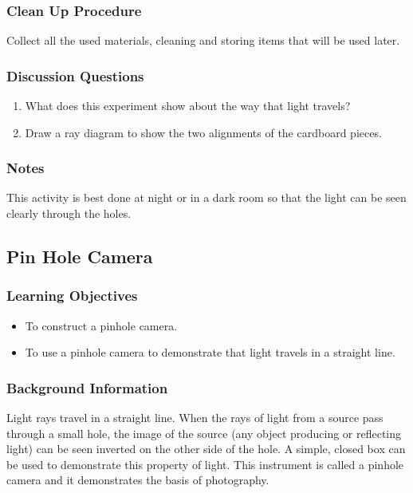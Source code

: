 \subsubsection*{Clean Up Procedure}
Collect all the used materials, cleaning and storing items that will be used later.

\subsubsection*{Discussion Questions}
\begin{enumerate}
\item{What does this experiment show about the way that light travels?}
\item{Draw a ray diagram to show the two alignments of the cardboard pieces.}
\end{enumerate}

\subsubsection*{Notes}
This activity is best done at night or in a dark room so that the light can be seen clearly through the holes.


\subsection{Pin Hole Camera}

\subsubsection*{Learning Objectives}
\begin{itemize}
\item{To construct a pinhole camera.}
\item{To use a pinhole camera to demonstrate that light travels in a straight line.}
\end{itemize}

\subsubsection*{Background Information}
Light rays travel in a straight line.  When the rays of light from a source pass through a small hole, the image of the source (any object producing or reflecting light) can be seen inverted on the other side of the hole.  A simple, closed box can be used to demonstrate this property of light.  This instrument is called a pinhole camera and it demonstrates the basis of photography.

